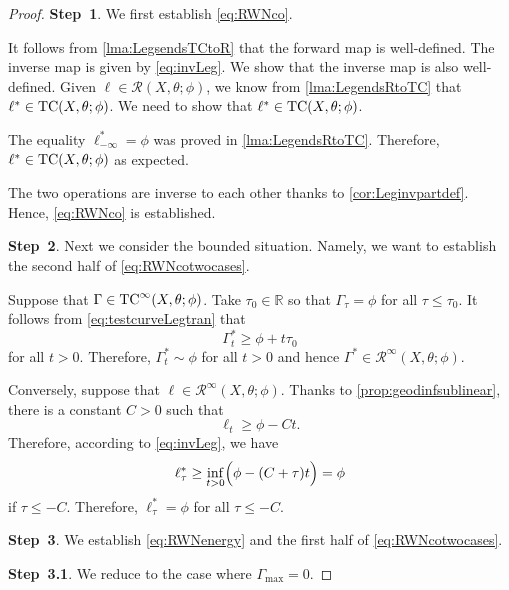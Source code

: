 \begin{proof}
    \textbf{Step~1}. We first establish \eqref{eq:RWNco}.

    It follows from \cref{lma:LegsendsTCtoR} that the forward map is well-defined. The inverse map is given by \eqref{eq:invLeg}. We show that the inverse map is also well-defined. Given $\ell\in \mathcal{R}(X,\theta;\phi)$, we know from \cref{lma:LegendsRtoTC} that $\ell^*\in \mathrm{TC}(X,\theta;\phi)$.
    We need to show that $\ell^*\in \mathrm{TC}(X,\theta;\phi)$.

    The equality $\ell^*_{-\infty}=\phi$ was proved in \cref{lma:LegendsRtoTC}. Therefore, $\ell^*\in \mathrm{TC}(X,\theta;\phi)$ as expected.

    The two operations are inverse to each other thanks to \cref{cor:Leginvpartdef}. Hence, \eqref{eq:RWNco} is established.

    \textbf{Step~2}.
    Next we consider the bounded situation. Namely, we want to establish the second half of \eqref{eq:RWNcotwocases}.

    Suppose that $\Gamma\in \mathrm{TC}^{\infty}(X,\theta;\phi)$. Take $\tau_0\in \mathbb{R}$ so that $\Gamma_{\tau}=\phi$ for all $\tau\leq \tau_0$. It follows from \eqref{eq:testcurveLegtran} that
    \[
    \Gamma_t^*\geq \phi+t\tau_0
    \]
    for all $t>0$. Therefore, $\Gamma^*_t\sim \phi$ for all $t>0$ and hence $\Gamma^*\in \mathcal{R}^{\infty}(X,\theta;\phi)$.

    Conversely, suppose that $\ell\in \mathcal{R}^{\infty}(X,\theta;\phi)$. Thanks to \cref{prop:geodinfsublinear}, there is a constant $C>0$ such that
    \[
    \ell_t\geq \phi-Ct.
    \]
    Therefore, according to \eqref{eq:invLeg}, we have
    \[
    \ell^*_{\tau}\geq \inf_{t>0} \Bigl( \phi-(C+\tau)t \Bigr)=\phi
    \]
    if $\tau\leq -C$. Therefore, $\ell^*_{\tau}=\phi$ for all $\tau\leq -C$.

    \textbf{Step~3}. We establish \eqref{eq:RWNenergy} and the first half of \eqref{eq:RWNcotwocases}.

    \textbf{Step~3.1}. We reduce to the case where $\Gamma_{\max}=0$.


\end{proof}
